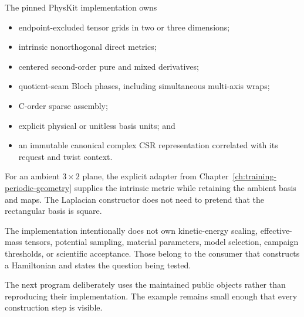 The pinned PhysKit implementation owns

\begin{itemize}
  \item endpoint-excluded tensor grids in two or three dimensions;
  \item intrinsic nonorthogonal direct metrics;
  \item centered second-order pure and mixed derivatives;
  \item quotient-seam Bloch phases, including simultaneous multi-axis wraps;
  \item C-order sparse assembly;
  \item explicit physical or unitless basis units; and
  \item an immutable canonical complex CSR representation correlated with its
        request and twist context.
\end{itemize}

For an ambient $3\times2$ plane, the explicit adapter from
Chapter~\ref{ch:training-periodic-geometry} supplies the intrinsic metric while
retaining the ambient basis and maps. The Laplacian constructor does not need
to pretend that the rectangular basis is square.

The implementation intentionally does not own kinetic-energy scaling,
effective-mass tensors, potential sampling, material parameters, model
selection, campaign thresholds, or scientific acceptance. Those belong to the
consumer that constructs a Hamiltonian and states the question being tested.

The next program deliberately uses the maintained public objects rather than
reproducing their implementation. The example remains small enough that every
construction step is visible.

